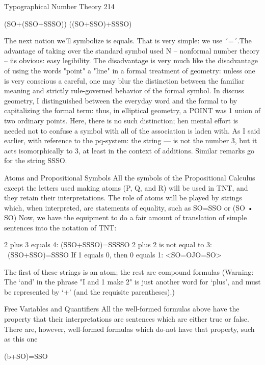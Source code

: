 Typographical Number Theory                                                                214

                                    (SO+(SSO+SSSO))
                                    ((SO+SSO)+SSSO)

The next notion we'll symbolize is equals. That is very simple: we use ´=´.The advantage
of taking over the standard symbol used N -- nonformal number theory -- iis obvious:
easy legibility. The disadvantage is very much like the disadvantage of using the words
"point" a "line" in a formal treatment of geometry: unless one is very conscious a careful,
one may blur the distinction between the familiar meaning and strictly rule-governed
behavior of the formal symbol. In discuss geometry, I distinguished between the
everyday word and the formal to by capitalizing the formal term: thus, in elliptical
geometry, a POINT was 1 union of two ordinary points. Here, there is no such
distinction; hen mental effort is needed not to confuse a symbol with all of the association
is laden with. As I said earlier, with reference to the pq-system: the string --- is not the
number 3, but it acts isomorphically to 3, at least in the context of additions. Similar
remarks go for the string SSSO.

                        Atoms and Propositional Symbols
All the symbols of the Propositional Calculus except the letters used making atoms (P, Q,
and R) will be used in TNT, and they retain their interpretations. The role of atoms will
be played by strings which, when interpreted, are statements of equality, such as
SO=SSO or (SO • SO) Now, we have the equipment to do a fair amount of translation of
simple sentences into the notation of TNT:

            2 plus 3 equals 4:                (SSO+SSSO)=SSSSO
            2 plus 2 is not equal to 3:       ~(SSO+SSO)=SSSO
            If 1 equals 0, then 0 equals 1:   <SO=OJO=SO>

The first of these strings is an atom; the rest are compound formulas (Warning: The `and'
in the phrase "I and 1 make 2" is just another word for `plus', and must be represented by
`+' (and the requisite parentheses).)

                          Free Variables and Quantifiers
All the well-formed formulas above have the property that their interpretations are
sentences which are either true or false. There are, however, well-formed formulas which
do-not have that property, such as this one

                                       (b+SO)=SSO

